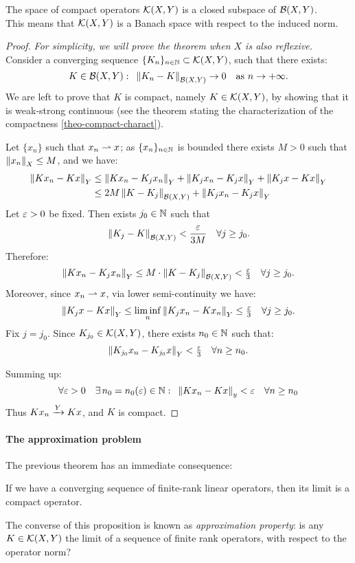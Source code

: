 \begin{theo}
	The space of compact operators $\mathcal K(X,Y)$ is a closed subspace of $\mathcal B(X,Y)$.\\
	This means that $\mathcal K(X,Y)$ is a Banach space with respect to the induced norm.
\end{theo}
\begin{proof} \textit{For simplicity, we will prove the theorem when $X$ is also reflexive.}\\
	Consider a converging sequence $\{K_n\}_{n\in\mathbb N} \subset \mathcal K(X,Y)$, such that there exists: $$K \in \mathcal B(X,Y) : \enspace \left\lVert K_n-K\right\rVert_{\mathcal B(X,Y)}\to 0 \quad \text{as } n \to +\infty.$$
	We are left to prove that $K$ is compact, namely $K \in \mathcal K(X,Y)$, by showing that it is weak-strong continuous (see the theorem stating the characterization of the compactness \vref{theo-compact-charact}).
	
	Let $\{x_n\}$ such that $x_n \rightharpoonup x$; as $\{x_n\}_{n\in\mathbb N}$ is bounded there exists $M > 0$ such that $\left\lVert x_n\right\rVert_X \leq M$, and we have:
	\begin{align*}
		\left\lVert Kx_n - Kx\right\rVert_Y 
		& \leq \left\lVert Kx_n-K_j x_n\right\rVert_Y + \left\lVert K_jx_n- K_j x\right\rVert_Y + \left\lVert K_j x- K x\right\rVert_Y\\
		& \leq 2M \left\lVert K-K_j\right\rVert_{\mathcal B(X,Y)} + \left\lVert K_jx_n- K_j x\right\rVert_Y
	\end{align*}
	Let $\varepsilon > 0$ be fixed. Then exists $j_0 \in \mathbb N$ such that $$\left\lVert K_j -K\right\rVert_{\mathcal B(X,Y)} < \frac{\varepsilon}{3M} \quad \forall j \geq j_0.$$
	Therefore:
	$$\left\lVert Kx_n - K_j x_n\right\rVert_Y 
	\leq M \cdot \left\lVert K-K_j\right\rVert_{\mathcal B(X,Y)} < \tfrac {\varepsilon} 3
	\quad
	\forall j \geq j_0
	.$$
	Moreover, since $x_n \rightharpoonup x$, via lower semi-continuity we have:
	$$
	\left\lVert K_jx-Kx\right\rVert_Y 
	\leq \liminf_n \left\lVert K_j x_n-Kx_n\right\rVert_Y \le \tfrac {\varepsilon} 3
	\quad
	\forall j \geq j_0
	.$$
	Fix $j=j_0$. Since $K_{j_0} \in \mathcal K(X,Y)$, there exists $n_0 \in \mathbb N$ such that:
	$$
	\left\lVert K_{j_0}x_n - K_{j_0}x\right\rVert_Y 
	< \tfrac {\varepsilon} 3
	\quad
	\forall n \geq  n_0
	.$$
	
	Summing up:
	$$\forall \varepsilon > 0 \quad \exists \, n_0=n_0(\varepsilon) \in \mathbb N : \enspace \left\lVert Kx_n -Kx\right\rVert_y < \varepsilon \quad \forall n \geq n_0$$
	Thus $Kx_n \xrightarrow{Y} Kx$, and $K$ is compact.
\end{proof}

\paragraph{The approximation problem} The previous theorem has an immediate consequence:
\begin{prop}
	If we have a converging sequence of finite-rank linear  operators, then its limit is a compact operator.
\end{prop}
The converse of this proposition is known as \emph{approximation property}: is any $K \in \mathcal K(X,Y)$ the limit of a sequence of finite rank operators, with respect to the operator norm? 

